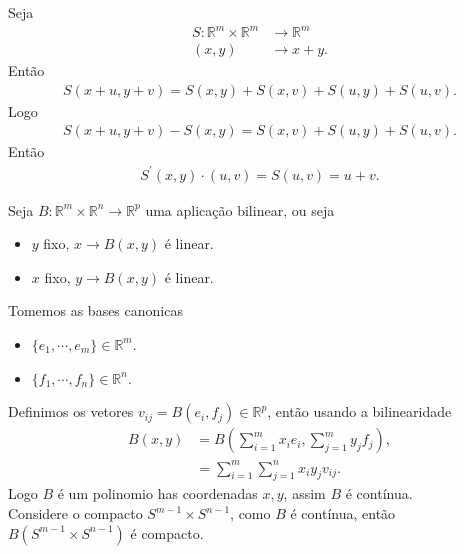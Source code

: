 \begin{example}
  Seja
  \begin{align*}
    S:\mathbb{R}^{m}\times\mathbb{R}^{m}&\to\mathbb{R}^{m}\\
    (x,y)&\to x+y.
  \end{align*}
  Então
  \begin{align*}
    S(x+u,y+v)=S(x,y)+S(x,v)+S(u,y)+S(u,v).
  \end{align*}
  Logo
  \begin{align*}
    S(x+u,y+v)-S(x,y)=S(x,v)+S(u,y)+S(u,v).
  \end{align*}
  Então
  \begin{align*}
    S^{\prime}(x,y)\cdot(u,v)=S(u,v)=u+v.
  \end{align*}
\end{example}
\begin{example}\label{ex:aplicacoes-bilineares}
  Seja $B:\mathbb{R}^{m}\times\mathbb{R}^{n}\to\mathbb{R}^{p}$ uma aplicação bilinear, ou seja
  \begin{itemize}
    \item $y$ fixo, $x\to B(x,y)$ é linear. 
    \item $x$ fixo, $y\to B(x,y)$ é linear. 
  \end{itemize}
  Tomemos as bases canonicas
  \begin{itemize}
    \item $\{e_1,\cdots,e_m\}\in\mathbb{R}^{m}$.
    \item $\{f_1,\cdots,f_n\}\in\mathbb{R}^{n}$.
  \end{itemize}
  Definimos os vetores $v_{ij}=B(e_i,f_j)\in\mathbb{R}^{p}$, então usando a bilinearidade
  \begin{align*}
    B(x,y)&=B\left( \sum_{i=1}^{m}x_ie_i,\sum_{j=1}^{m}y_jf_j \right),\\
    &=\sum_{i=1}^{m}\sum_{j=1}^{n}x_iy_jv_{ij}.
  \end{align*}
  Logo $B$ é um polinomio has coordenadas $x,y$, assim $B$ é contínua.\\
  Considere o compacto $S^{m-1}\times S^{n-1}$, como $B$ é contínua, então $B(S^{m-1}\times S^{n-1})$ é compacto.


\end{example}
